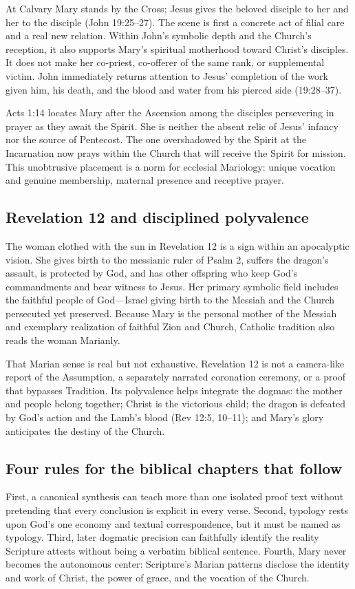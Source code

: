 At Calvary Mary stands by the Cross; Jesus gives the beloved disciple to her and her to the disciple (John 19:25--27). The scene is first a concrete act of filial care and a real new relation. Within John's symbolic depth and the Church's reception, it also supports Mary's spiritual motherhood toward Christ's disciples. It does not make her co-priest, co-offerer of the same rank, or supplemental victim. John immediately returns attention to Jesus' completion of the work given him, his death, and the blood and water from his pierced side (19:28--37).

Acts 1:14 locates Mary after the Ascension among the disciples persevering in prayer as they await the Spirit. She is neither the absent relic of Jesus' infancy nor the source of Pentecost. The one overshadowed by the Spirit at the Incarnation now prays within the Church that will receive the Spirit for mission. This unobtrusive placement is a norm for ecclesial Mariology: unique vocation and genuine membership, maternal presence and receptive prayer.

\subsection{Revelation 12 and disciplined polyvalence}

The woman clothed with the sun in Revelation 12 is a sign within an apocalyptic vision. She gives birth to the messianic ruler of Psalm 2, suffers the dragon's assault, is protected by God, and has other offspring who keep God's commandments and bear witness to Jesus. Her primary symbolic field includes the faithful people of God---Israel giving birth to the Messiah and the Church persecuted yet preserved. Because Mary is the personal mother of the Messiah and exemplary realization of faithful Zion and Church, Catholic tradition also reads the woman Marianly.

That Marian sense is real but not exhaustive. Revelation 12 is not a camera-like report of the Assumption, a separately narrated coronation ceremony, or a proof that bypasses Tradition. Its polyvalence helps integrate the dogmas: the mother and people belong together; Christ is the victorious child; the dragon is defeated by God's action and the Lamb's blood (Rev 12:5, 10--11); and Mary's glory anticipates the destiny of the Church.

\subsection{Four rules for the biblical chapters that follow}

First, a canonical synthesis can teach more than one isolated proof text without pretending that every conclusion is explicit in every verse. Second, typology rests upon God's one economy and textual correspondence, but it must be named as typology. Third, later dogmatic precision can faithfully identify the reality Scripture attests without being a verbatim biblical sentence. Fourth, Mary never becomes the autonomous center: Scripture's Marian patterns disclose the identity and work of Christ, the power of grace, and the vocation of the Church.
